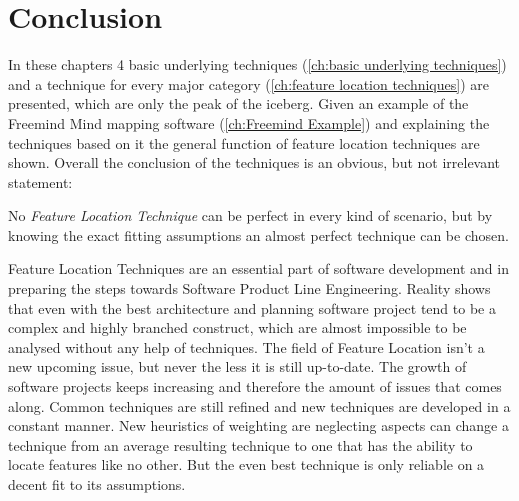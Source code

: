 \chapter{Conclusion}

In these chapters 4 basic underlying techniques (\autoref{ch:basic underlying techniques}) and a technique for every major category (\autoref{ch:feature location techniques}) are presented, which are only the peak of the iceberg. Given an example of the Freemind Mind mapping software (\autoref{ch:Freemind Example}) and explaining the techniques based on it the general function of feature location techniques are shown. Overall the conclusion of the techniques is an obvious, but not irrelevant statement: \newline
\begin{center}
	No \textit{Feature Location Technique} can be perfect in every kind of scenario, but by knowing the exact fitting assumptions an almost perfect technique can be chosen.
\end{center} 

Feature Location Techniques are an essential part of software development and in preparing the steps towards Software Product Line Engineering. Reality shows that even with the best architecture and planning software project tend to be a complex and highly branched construct, which are almost impossible to be analysed without any help of techniques. \newline
The field of Feature Location isn't a new upcoming issue, but never the less it is still up-to-date. The growth of software projects keeps increasing and therefore the amount of issues that comes along. Common techniques are still refined and new techniques are developed in a constant manner. New heuristics of weighting are neglecting aspects can change a technique from an average resulting technique to one that has the ability to locate features like no other. But the even best technique is only reliable on a decent fit to its assumptions. \newline
\emptyline



\cleardoublepage
